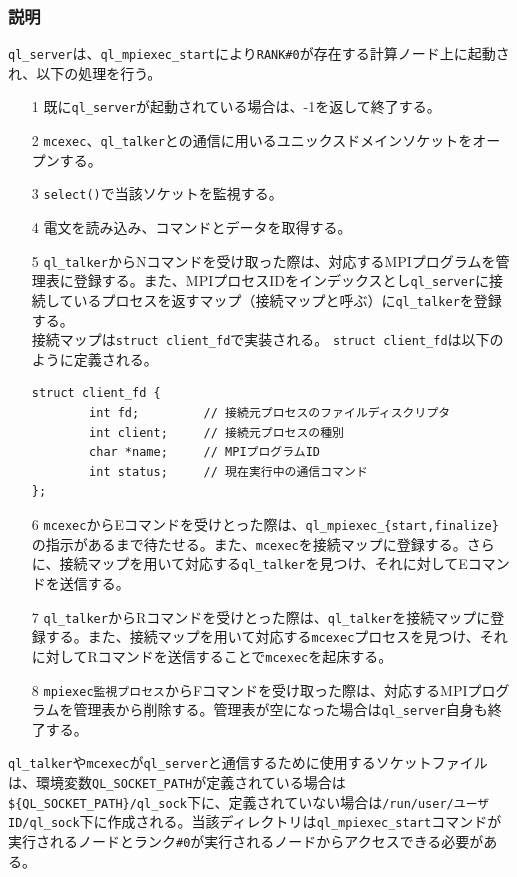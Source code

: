\documentclass[twoside,11pt,fleqn]{book}
\begin{document}
\subsubsection*{説明}{\quad}
\texttt{ql\_server}は、\texttt{ql\_mpiexec\_start}により\texttt{RANK\#0}が存在する計算ノード上に起動され、以下の処理を行う。
%
\begin{itemize}
\item[1]既に\texttt{ql\_server}が起動されている場合は、-1を返して終了する。
\item[2]\texttt{mcexec}、\texttt{ql\_talker}との通信に用いるユニックスドメインソケットをオープンする。
\item[3]\texttt{select()}で当該ソケットを監視する。
\item[4]電文を読み込み、コマンドとデータを取得する。
\item[5]\texttt{ql\_talker}からNコマンドを受け取った際は、対応するMPIプログラムを管理表に登録する。また、MPIプロセスIDをインデックスとし\texttt{ql\_server}に接続しているプロセスを返すマップ（接続マップと呼ぶ）に\texttt{ql\_talker}を登録する。\\
接続マップは\texttt{struct client\_fd}で実装される。
\texttt{struct client\_fd}は以下のように定義される。
\begin{verbatim}
struct client_fd {
        int fd;         // 接続元プロセスのファイルディスクリプタ
        int client;     // 接続元プロセスの種別
        char *name;     // MPIプログラムID
        int status;     // 現在実行中の通信コマンド
};
\end{verbatim}

\item[6]\texttt{mcexec}からEコマンドを受けとった際は、\texttt{ql\_mpiexec\_\{start,finalize\}}の指示があるまで待たせる。また、\texttt{mcexec}を接続マップに登録する。さらに、接続マップを用いて対応する\texttt{ql\_talker}を見つけ、それに対してEコマンドを送信する。
\item[7]\texttt{ql\_talker}からRコマンドを受けとった際は、\texttt{ql\_talker}を接続マップに登録する。また、接続マップを用いて対応する\texttt{mcexec}プロセスを見つけ、それに対してRコマンドを送信することで\texttt{mcexec}を起床する。
\item[8]\texttt{mpiexec監視プロセス}からFコマンドを受け取った際は、対応するMPIプログラムを管理表から削除する。管理表が空になった場合は\texttt{ql\_server}自身も終了する。
\end{itemize}

\texttt{ql\_talker}や\texttt{mcexec}が\texttt{ql\_server}と通信するために使用するソケットファイルは、環境変数\texttt{QL\_SOCKET\_PATH}が定義されている場合は\texttt{\$\{QL\_SOCKET\_PATH\}/ql\_sock}下に、定義されていない場合は\texttt{/run/user/ユーザID/ql\_sock}下に作成される。当該ディレクトリは\texttt{ql\_mpiexec\_start}コマンドが実行されるノードとランク\texttt{\#0}が実行されるノードからアクセスできる必要がある。
\end{document}
